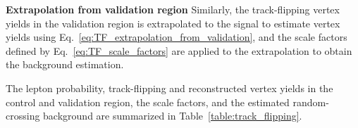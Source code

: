 \textbf{Extrapolation from validation region} Similarly, the track-flipping vertex yields in the validation region is extrapolated to the signal to estimate vertex yields using Eq.~\ref{eq:TF_extrapolation_from_validation}, and the scale factors defined by Eq.~\ref{eq:TF_scale_factors} are applied to the extrapolation to obtain the background estimation.

The lepton probability, track-flipping and reconstructed vertex yields in the control and validation region, the scale factors, and the estimated random-crossing background are summarized in Table~\ref{table:track_flipping}.

\begin{table}[!htb]%
  \centering
  \begin{minipage}[b]{\textwidth}
  \end{minipage}



\end{table}
